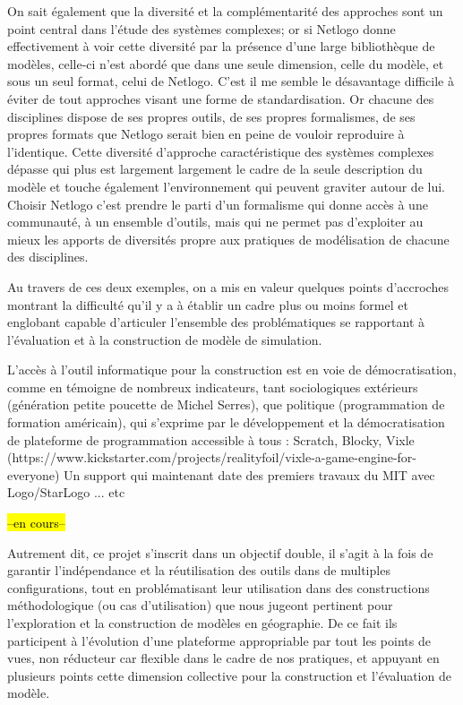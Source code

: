 On sait également que la diversité et la complémentarité des approches sont un point central dans l'étude des systèmes complexes; or si Netlogo donne effectivement à voir cette diversité par la présence d'une large bibliothèque de modèles, celle-ci n'est abordé que dans une seule dimension, celle du modèle, et sous un seul format, celui de Netlogo. C'est il me semble le désavantage difficile à éviter de tout approches visant une forme de standardisation. Or chacune des disciplines dispose de ses propres outils, de ses propres formalismes, de ses propres formats que Netlogo serait bien en peine de vouloir reproduire à l'identique. Cette diversité d'approche caractéristique des systèmes complexes dépasse qui plus est largement largement le cadre de la seule description du modèle et touche également l'environnement qui peuvent graviter autour de lui. Choisir Netlogo c'est prendre le parti d'un formalisme qui donne accès à une communauté, à un ensemble d'outils, mais qui ne permet pas d'exploiter au mieux les apports de diversités propre aux pratiques de modélisation de chacune des disciplines. 

Au travers de ces deux exemples, on a mis en valeur quelques points d'accroches montrant la difficulté qu'il y a à établir un cadre plus ou moins formel et englobant capable d'articuler l'ensemble des problématiques se rapportant à l'évaluation et à la construction de modèle de simulation.  


L'accès à l'outil informatique pour la construction est en voie de démocratisation, comme en témoigne de nombreux indicateurs, tant sociologiques extérieurs (génération petite poucette de Michel Serres), que politique (programmation de formation américain), qui s'exprime par le développement et la démocratisation de plateforme de programmation accessible à tous : Scratch, Blocky, Vixle (https://www.kickstarter.com/projects/realityfoil/vixle-a-game-engine-for-everyone)
Un support qui maintenant date des premiers travaux du MIT avec Logo/StarLogo ... etc


\hl{--en cours--}

Autrement dit, ce projet s'inscrit dans un objectif double, il s'agit à la fois de garantir l'indépendance et la réutilisation des outils dans de multiples configurations, tout en problématisant leur utilisation dans des constructions méthodologique (ou cas d'utilisation) que nous jugeont pertinent pour l'exploration et la construction de modèles en géographie. De ce fait ils participent à l'évolution d'une plateforme appropriable par tout les points de vues, non réducteur car flexible dans le cadre de nos pratiques, et appuyant en plusieurs points cette dimension collective pour la construction et l'évaluation de modèle.


